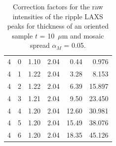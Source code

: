 \begin{table}[htbp]
\begin{tabular}{rrrrrr}
    4  & 0  & 1.10 & 2.04 & 0.44  & 0.976   \\
    4  & 1  & 1.22 & 2.04 & 3.28  & 8.153   \\
    4  & 2  & 1.22 & 2.04 & 6.39  & 15.897  \\
    4  & 3  & 1.21 & 2.04 & 9.50  & 23.450  \\
    4  & 4  & 1.20 & 2.04 & 12.60 & 30.981  \\
    4  & 5  & 1.20 & 2.04 & 15.49 & 38.076  \\
    4  & 6  & 1.20 & 2.04 & 18.35 & 45.126  \\
    \hline
    \end{tabular}%
  \caption{Correction factors for the raw intensities of the ripple LAXS 
  peaks for thickness of an oriented sample $t$ = 10~$\mu$m and mosaic
  spread $\alpha_M$ = 0.05\textdegree.}
  \label{tab:LAXS_correction1}%
\end{table}%
    
